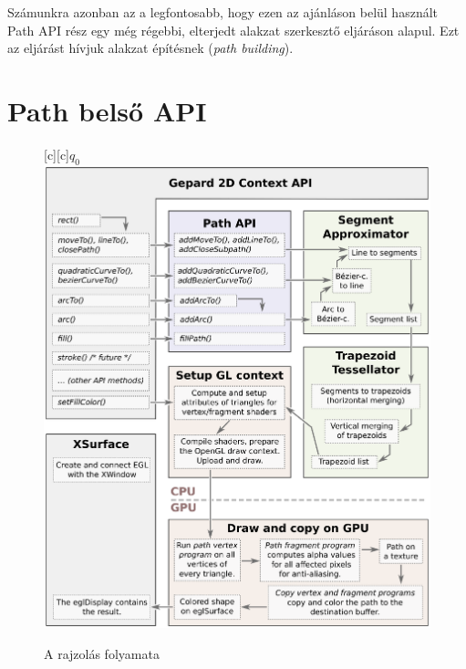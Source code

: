 \documentclass[12pt]{report}
\theoremstyle{definition}
\newcommand{\inenglish}[1]{\textsl{#1}}
\begin{document}
Számunkra azonban az a legfontosabb, hogy ezen az ajánláson belül
használt Path API rész egy még régebbi, elterjedt alakzat szerkesztő
eljáráson alapul. Ezt az eljárást hívjuk alakzat építésnek
(\inenglish{path building}).



    \chapter{Path belső API}

    \begin{figure}[h]
    \centering
    [c][c]{$q_0$}
    \includegraphics[scale=0.6]{dataflow.eps}
    \caption{\label{dataflow-diagram} A rajzolás folyamata}
    \end{figure}


\end{document}
